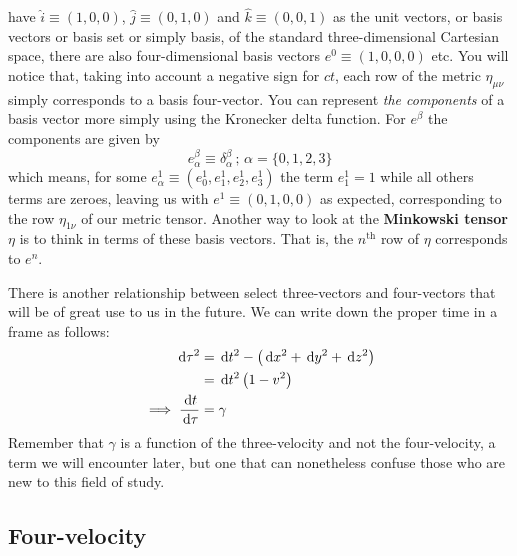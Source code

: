 \documentclass[english,seminar]{lecture}
\newcommand{\diff}{\,\textrm{d}}
\begin{document}
\noindent{} have $\hat{i} \equiv (1, 0, 0)$, $\hat{j}\equiv(0,1,0)$ and $\hat{k}\equiv(0,0,1)$ as the unit vectors, or basis vectors or basis set or simply basis, of the standard three-dimensional Cartesian space, there are also four-dimensional basis vectors $e^0 \equiv (1,0,0,0)$ etc. You will notice that, taking into account a negative sign for $ct$, each row of the metric $\eta_{\mu\nu}$ simply corresponds to a basis four-vector. You can represent \textit{the components} of a basis vector more simply using the Kronecker delta function. For $e^\beta$ the components are given by
\[e_\alpha^\beta \equiv \delta_\alpha^\beta \,;\,\alpha = \lbrace 0, 1, 2, 3 \rbrace \]\label{page:eta-bases}%
which means, for some $e^1_\alpha \equiv (e_0^1, e_1^1, e_2^1, e_3^1)$ the term $e_1^1 = 1$ while all others terms are zeroes, leaving us with $e^1 \equiv (0,1,0,0)$ as expected, corresponding to the row $\eta_{1\nu}$ of our metric tensor. Another way to look at the \textbf{Minkowski tensor} $\eta$ is to think in terms of these basis vectors. That is, the $n^\textrm{th}$ row of $\eta$ corresponds to $e^n$.

There is another relationship between select three-vectors and four-vectors that will be of great use to us in the future. We can write down the proper time in a frame as follows:
\begin{align}
	\diff \tau^2 &= \diff t^2 - \left( \diff x^2 + \diff y^2 + \diff z^2 \right) \nonumber\\
				&= \diff t^2 \left( 1 - v^2 \right)
				\nonumber\\
	\implies {\diff t \over \diff \tau } &= \gamma \label{eq:t-tau-gamma}
\end{align}%
Remember that $\gamma$ is a function of the three-velocity and not the four-velocity, a term we will encounter later, but one that can nonetheless confuse those who are new to this field of study.

\subsection{Four-velocity}
\end{document}
